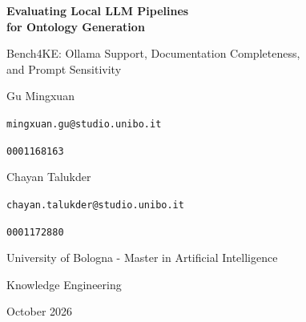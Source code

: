\documentclass[11pt,a4paper]{article}
\begin{document}
\begin{center}
  \vspace*{0.5cm}
  {\LARGE\bfseries Evaluating Local LLM Pipelines\\[0.18em]
  for Ontology Generation\par}
  \vspace{0.35cm}
  {\large Bench4KE: Ollama Support, Documentation Completeness,\\
  and Prompt Sensitivity\par}
  \vspace{0.55cm}
  {\large Gu Mingxuan\par}
  {\small\texttt{mingxuan.gu@studio.unibo.it}\par}
  {\small\texttt{0001168163}\par}
  \vspace{0.22cm}
  {\large Chayan Talukder\par}
  {\small\texttt{chayan.talukder@studio.unibo.it}\par}
  {\small\texttt{0001172880}\par}
  \vspace{0.28cm}
  {\normalsize University of Bologna - Master in Artificial Intelligence\par}
  {\normalsize Knowledge Engineering\par}
  \vspace{0.28cm}
  {\normalsize October 2026\par}
\end{center}

\vspace{0.25cm}

\begin{abstract}
This project evaluates three ontology-generation pipelines---the
Ontogenia-labelled Memoryless CQ-by-CQ baseline, Domain-OntoGen, and
NeOn-GPT---using one local Ollama model. The experiment covers 17
ontology-engineering scenarios, 74 source-ordered competency questions (CQs),
and three prompt variants: the recovered baseline P0, serialization-only P1,
and syntax-verification P2. Across 153 tasks, 101 final ontologies were
parseable. Final parse success was 14/51 for the Memoryless baseline, 50/51 for
Domain-OntoGen, and 37/51 for NeOn-GPT. Paired analysis found no
statistically significant parse-success difference among P0, P1, and P2 for
any method. This result does not imply prompt invariance: descriptive
term-Jaccard summaries show substantial ontology-content drift from P0 where
comparisons are available. Documentation completeness and parse robustness
also varied materially by method. The project supplies the mandatory local
model execution path and two new evaluation components.
\end{abstract}
\end{document}
